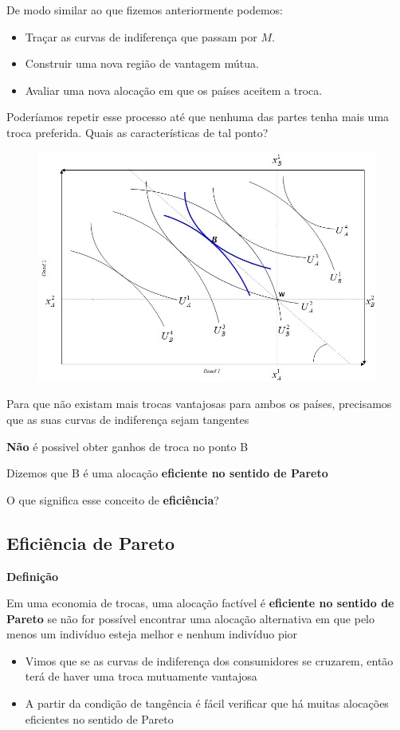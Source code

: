 \documentclass[a4paper,12pt]{article}[abntex2]
\begin{document}
De modo similar ao que fizemos anteriormente podemos:
\begin{itemize}
    \item Traçar as curvas de indiferença que passam por $M$.
    \item Construir uma nova região de vantagem mútua.
    \item Avaliar uma nova alocação em que os países aceitem a troca.
\end{itemize}

Poderíamos repetir esse processo até que nenhuma das partes tenha mais uma troca preferida. Quais as características de tal ponto?


\begin{figure}[H]
    \centering
    \includegraphics[width=0.70\linewidth]{Imagens/a2i4.png}
\end{figure}

Para que não existam mais trocas vantajosas para ambos os países, precisamos que as suas curvas de indiferença sejam tangentes

\textbf{Não} é possivel obter ganhos de troca no ponto B

Dizemos que B  é uma alocação \textbf{eficiente no sentido de Pareto}

O que significa esse conceito de \textbf{eficiência}?

\subsection{\textbf{Eficiência de Pareto}}

\textbf{Definição}

Em uma economia de trocas, uma alocação factível é \textbf{eficiente no sentido de Pareto} se não  for  possível  encontrar  uma  alocação  alternativa  em  que  pelo  menos  um  indivíduo esteja  melhor  e  nenhum  indivíduo  pior\begin{itemize}
    \item Vimos que se as curvas de indiferença dos consumidores se cruzarem, então terá de haver uma troca mutuamente vantajosa
    \item A partir da condição de tangência é fácil verificar que há muitas alocações eficientes no sentido de Pareto
\end{itemize}
\end{document}
